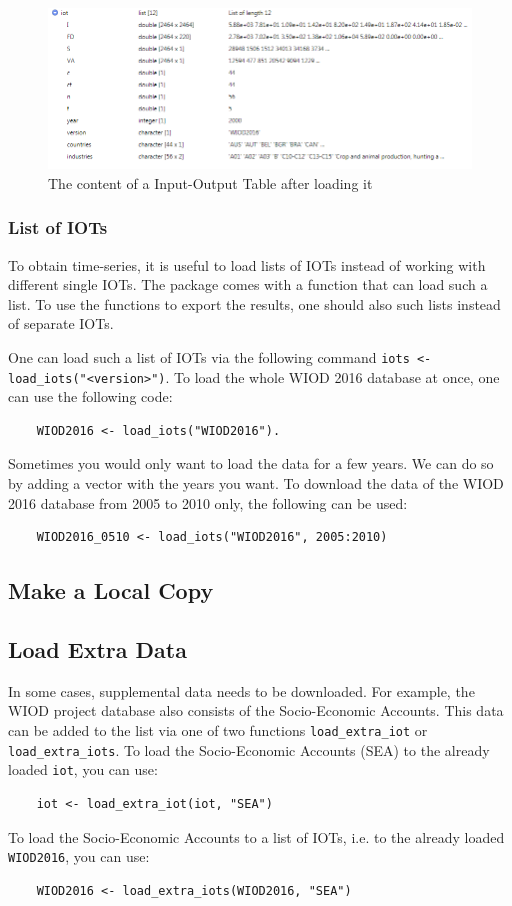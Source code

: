 \documentclass[10pt,a4paper]{paper}
\begin{document}
	\begin{figure}[t]
	\centering
	\includegraphics[width=\linewidth]{content_iot}
	\caption{The content of a Input-Output Table after loading it}
	\label{fig:contentiot}
	\end{figure}

	
	\subsubsection{List of IOTs}
	To obtain time-series, it is useful to load lists of IOTs instead of working with different single IOTs. The package comes with a function that can load such a list. To use the functions to export the results, one should also such lists instead of separate IOTs.
	
	One can load such a list of IOTs via the following command \texttt{iots <- load\_iots("<version>")}. To load the whole WIOD 2016 database at once, one can use the following code:
	\begin{Verbatim}
	WIOD2016 <- load_iots("WIOD2016").
	\end{Verbatim}
	Sometimes you would only want to load the data for a few years. We can do so by adding a vector with the years you want. To download the data of the WIOD 2016 database from 2005 to 2010 only, the following can be used:
	\begin{Verbatim}
	WIOD2016_0510 <- load_iots("WIOD2016", 2005:2010)
	\end{Verbatim}
	
	\subsection{Make a Local Copy}
	
	\subsection{Load Extra Data}
	In some cases, supplemental data needs to be downloaded. For example, the WIOD project database also consists of the Socio-Economic Accounts. This data can be added to the list via one of two functions \texttt{load\_extra\_iot} or \texttt{load\_extra\_iots}. To load the Socio-Economic Accounts (SEA) to the already loaded \texttt{iot}, you can use:
	\begin{Verbatim}
	iot <- load_extra_iot(iot, "SEA")
	\end{Verbatim} 
	To load the Socio-Economic Accounts to a list of IOTs, i.e. to the already loaded \texttt{WIOD2016}, you can use:
	\begin{Verbatim}
	WIOD2016 <- load_extra_iots(WIOD2016, "SEA")
	\end{Verbatim}
	
\end{document}
